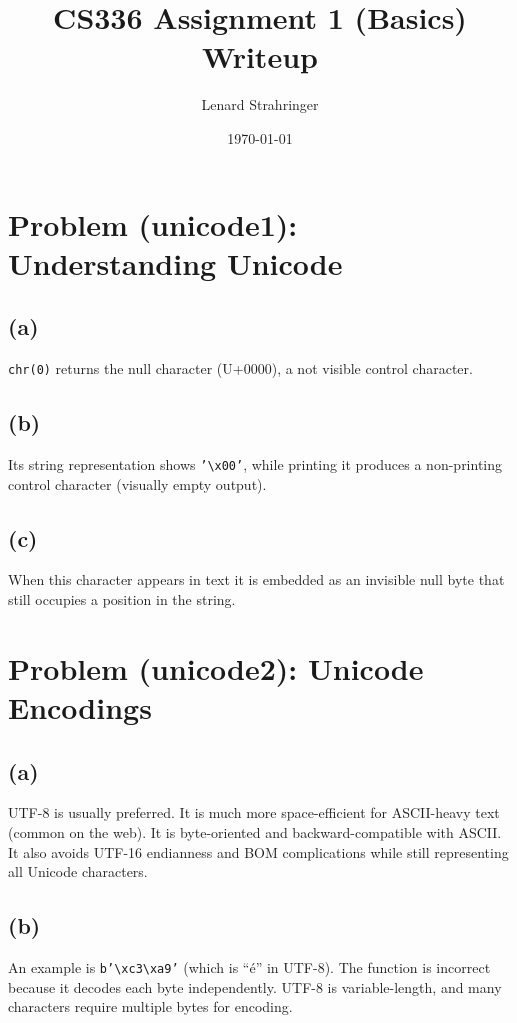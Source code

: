 \documentclass[11pt]{article}
\title{CS336 Assignment 1 (Basics)\\Writeup}
\author{Lenard Strahringer}
\date{\today}
\begin{document}
\maketitle
\tableofcontents
\newpage

\section{Problem (unicode1): Understanding Unicode}
\subsection*{(a)}
\texttt{chr(0)} returns the null character (U+0000), a not visible control character.

\subsection*{(b)}
Its string representation shows \texttt{'\textbackslash x00'}, while printing it produces a non-printing control character (visually empty output).

\subsection*{(c)}
When this character appears in text it is embedded as an invisible null byte that still occupies a position in the string.

\section{Problem (unicode2): Unicode Encodings}
\subsection*{(a)}
UTF-8 is usually preferred. It is much more space-efficient for ASCII-heavy text (common on the web). It is byte-oriented and backward-compatible with ASCII. It also avoids UTF-16 endianness and BOM complications while still representing all Unicode characters.

\subsection*{(b)}
An example is \texttt{b'\textbackslash xc3\textbackslash xa9'} (which is ``é'' in UTF-8). The function is incorrect because it decodes each byte independently. UTF-8 is variable-length, and many characters require multiple bytes for encoding.
\end{document}
